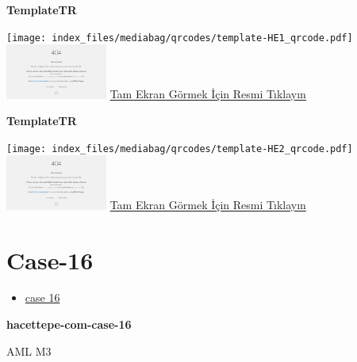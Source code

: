 \documentclass[
  letterpaper,
  DIV=11,
  numbers=noendperiod]{scrreprt}
\providecommand{\tightlist}{%
  \setlength{\itemsep}{0pt}\setlength{\parskip}{0pt}}\usepackage{longtable,booktabs,array}
\begin{document}
\textbf{TemplateTR}

\texttt{[image: index\_files/mediabag/qrcodes/template-HE1\_qrcode.pdf]}
\href{https://images.patolojiatlasi.com/template/HE1.html}{\includegraphics[width=0.25\textwidth,height=\textheight]{./screenshots/thumbnail_template-HE1.png}}
\href{https://images.patolojiatlasi.com/template/HE1.html}{Tam Ekran
Görmek İçin Resmi Tıklayın}

\textbf{TemplateTR}

\texttt{[image: index\_files/mediabag/qrcodes/template-HE2\_qrcode.pdf]}
\href{https://images.patolojiatlasi.com/template/HE2.html}{\includegraphics[width=0.25\textwidth,height=\textheight]{./screenshots/thumbnail_template-HE2.png}}
\href{https://images.patolojiatlasi.com/template/HE2.html}{Tam Ekran
Görmek İçin Resmi Tıklayın}

\hypertarget{sec-hacettepe-case-of-the-month-case-16}{%
\section{Case-16}\label{sec-hacettepe-case-of-the-month-case-16}}

\begin{itemize}
\tightlist
\item
  \href{https://www.youtube.com/watch?v=Tkempcd59I0&ab_channel=KemalKosemehmetoglu}{case
  16}
\end{itemize}

\textbf{hacettepe-com-case-16}

\begin{tcolorbox}[enhanced jigsaw, breakable, opacitybacktitle=0.6, arc=.35mm, colbacktitle=quarto-callout-tip-color!10!white, colback=white, toptitle=1mm, left=2mm, opacityback=0, colframe=quarto-callout-tip-color-frame, titlerule=0mm, rightrule=.15mm, bottomrule=.15mm, toprule=.15mm, bottomtitle=1mm, title=\textcolor{quarto-callout-tip-color}{\faLightbulb}\hspace{0.5em}{Tanı}, coltitle=black, leftrule=.75mm]

AML M3

\end{tcolorbox}
\end{document}
